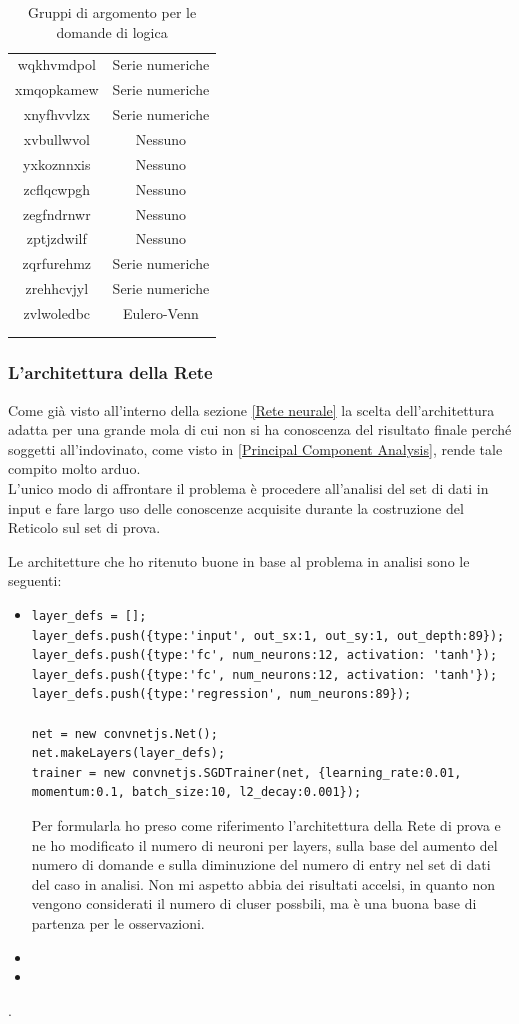 \begin{longtable}{|c|c|}
wqkhvmdpol & Serie numeriche \\
xmqopkamew & Serie numeriche \\
xnyfhvvlzx & Serie numeriche \\
xvbullwvol & Nessuno \\
yxkoznnxis & Nessuno \\
zcflqcwpgh & Nessuno \\
zegfndrnwr & Nessuno \\
zptjzdwilf & Nessuno \\
zqrfurehmz & Serie numeriche \\
zrehhcvjyl & Serie numeriche \\
zvlwoledbc & Eulero-Venn \\
\\
\hline
	
\caption{Gruppi di argomento per le domande di logica}\label{tab:Gruppi di argomento per le domande di logica}
\end{longtable}

\subsubsection{L'architettura della Rete}
\label{L'architettura della Rete}
Come già visto all'interno della sezione \ref{Rete neurale} la scelta dell'architettura adatta per una grande mola di cui non si ha conoscenza del risultato finale perché soggetti all'indovinato, come visto in \ref{Principal Component Analysis}, rende tale compito molto arduo.\\
L'unico modo di affrontare il problema è procedere all'analisi del set di dati in input e fare largo uso delle conoscenze acquisite durante la costruzione del Reticolo sul set di prova.

Le architetture che ho ritenuto buone in base al problema in analisi sono le seguenti:
\begin{itemize}
\item \begin{verbatim}
layer_defs = [];
layer_defs.push({type:'input', out_sx:1, out_sy:1, out_depth:89});
layer_defs.push({type:'fc', num_neurons:12, activation: 'tanh'});
layer_defs.push({type:'fc', num_neurons:12, activation: 'tanh'});
layer_defs.push({type:'regression', num_neurons:89});
        
net = new convnetjs.Net();
net.makeLayers(layer_defs);
trainer = new convnetjs.SGDTrainer(net, {learning_rate:0.01, momentum:0.1, batch_size:10, l2_decay:0.001});
\end{verbatim}
\noindent
Per formularla ho preso come riferimento l'architettura della Rete di prova e ne ho modificato il numero di neuroni per layers, sulla base del aumento del numero di domande e sulla diminuzione del numero di entry nel set di dati del caso in analisi. Non mi aspetto abbia dei risultati accelsi, in quanto non vengono considerati il numero di cluser possbili, ma è una buona base di partenza per le osservazioni.
\item 

\item

\end{itemize}
.
